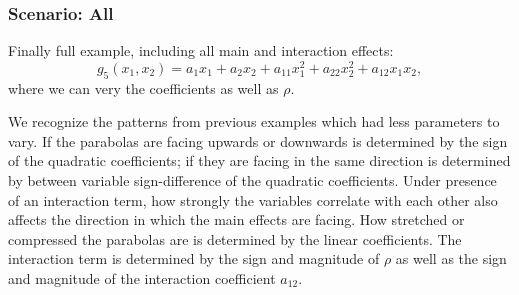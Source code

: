 \subsubsection*{Scenario: All}
Finally full example, including all main and interaction effects: $$g_5(x_1, x_2) = a_1 x_1 + a_2 x_2 + a_{11} x_1^2 + a_{22} x_2^2 + a_{12} x_1 x_2,$$ where we can very the coefficients as well as $\rho$.\par
We recognize the patterns from previous examples which had less parameters to vary. If the parabolas are facing upwards or downwards is determined by the sign of the quadratic coefficients; if they are facing in the same direction is determined by between variable sign-difference of the quadratic coefficients. Under presence of an interaction term, how strongly the variables correlate with each other also affects the direction in which the main effects are facing. How stretched or compressed the parabolas are is determined by the linear coefficients. The interaction term is determined by the sign and magnitude of $\rho$ as well as the sign and magnitude of the interaction coefficient $a_{12}$.\par
